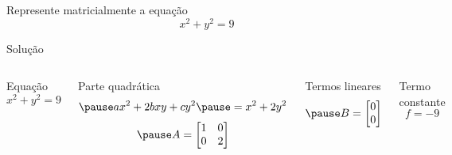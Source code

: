 \begin{question}
  Represente matricialmente a equação
  \[
    x^2 + y^2 = 9
  \]
\end{question}

\begin{resolution}{Solução}
\begin{columns}[t]
  Equação
  \[
    x^2 + y^2 = 9
  \]

  \pause
  Parte quadrática
  \[
    \pause
    ax^2 + 2bxy + cy^2
    \pause
    = x^2 + 2y^2
  \]
  \[
    \pause
    A = \begin{bmatrix}
      1 & 0 \\
      0 & 2
    \end{bmatrix}
  \]

  \pause
  Termos lineares
  \[
    \pause
    B = \begin{bmatrix} 0 \\ 0 \end{bmatrix}
  \]

  \bigskip
  \pause
  Termo constante
  \[
    f = -9
  \]
\end{columns}
\end{resolution}

\endinput
